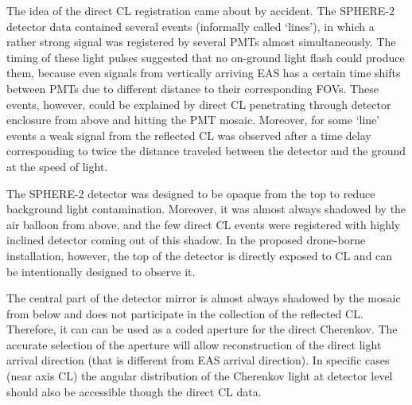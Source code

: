 \documentclass[a4paper,11pt]{article}
\begin{document}

The idea of the direct CL registration came about by accident. The SPHERE-2 detector data contained several events (informally called `lines'), in which a rather strong signal was registered by several PMTs almost simultaneously. The timing of these light pulses suggested that no on-ground light flash could produce them, because even signals from vertically arriving EAS has a certain time shifts between PMTs due to different distance to their corresponding FOVs. These events, however, could be explained by direct CL penetrating through detector enclosure from above and hitting the PMT mosaic. Moreover, for some `line' events a weak signal from the reflected CL was observed after a time delay corresponding to twice the distance traveled between the detector and the ground at the speed of light.


The SPHERE-2 detector was designed to be opaque from the top to reduce background light contamination. Moreover, it was almost always shadowed by the air balloon from above, and the few direct CL events were registered with highly inclined detector coming out of this shadow. In the proposed drone-borne installation, however, the top of the detector is directly exposed to CL and can be intentionally designed to observe it.

The central part of the detector mirror is almost always shadowed by the mosaic from below and does not participate in the collection of the reflected CL. Therefore, it can can be used as a coded aperture for the direct Cherenkov. The accurate selection of the aperture will allow reconstruction of the direct light arrival direction (that is different from EAS arrival direction). In specific cases (near axis CL) the angular distribution of the Cherenkov light at detector level should also be accessible though the direct CL data.
\end{document}
